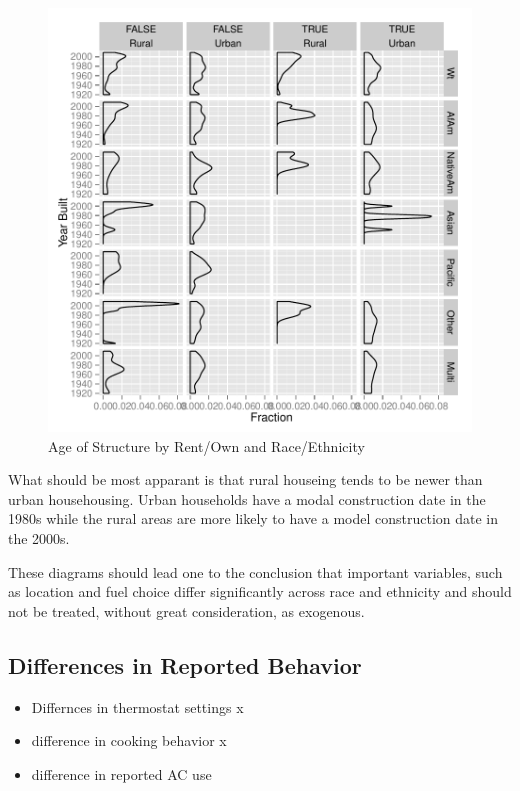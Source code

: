 \documentclass{article}
\begin{document}
\begin{figure}[htbp]
\begin{center}
\caption{Age of Structure by Rent/Own and Race/Ethnicity}
\label{fig:AgebyOwnRace}
\includegraphics{DraftEdwardsWoods-010}
\end{center}
\end{figure}

What should be most apparant is that rural houseing tends to be newer than urban househousing.  Urban households have a modal construction date in the 1980s while the rural areas are more likely to have a model construction date in the 2000s.

These diagrams should lead one to the conclusion that important variables, such as location and fuel choice differ significantly across race and ethnicity and should not be treated, without great consideration, as exogenous.

\subsection{Differences in Reported Behavior}
  
  \begin{itemize}
    \item Differnces in thermostat settings x

    \item difference in cooking behavior x
    \item difference in reported AC use

  \end{itemize}
  
\end{document}
